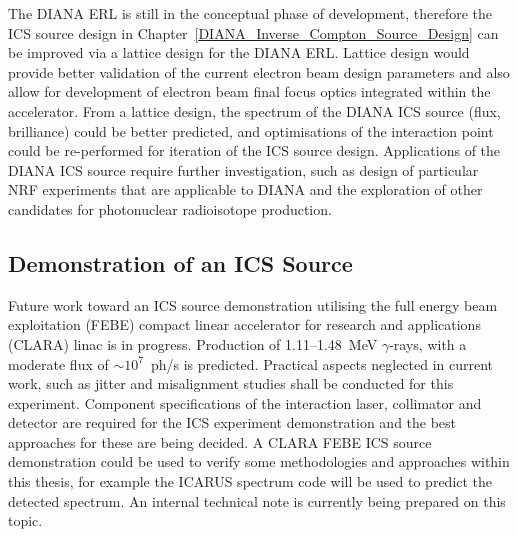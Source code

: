 \documentclass[../main.tex]{subfiles}
\begin{document}
The DIANA ERL is still in the conceptual phase of development, therefore the ICS source design in Chapter~\ref{DIANA_Inverse_Compton_Source_Design} can be improved via a lattice design for the DIANA ERL. Lattice design would provide better validation of the current electron beam design parameters and also allow for development of electron beam final focus optics integrated within the accelerator. From a lattice design, the spectrum of the DIANA ICS source (flux, brilliance) could be better predicted, and optimisations of the interaction point could be re-performed for iteration of the ICS source design. Applications of the DIANA ICS source require further investigation, such as design of particular NRF experiments that are applicable to DIANA and the exploration of other candidates for photonuclear radioisotope production.     

\subsection{Demonstration of an ICS Source}
Future work toward an ICS source demonstration utilising the full energy beam exploitation (FEBE) compact linear accelerator for research and applications (CLARA) linac \cite{angal2020design} is in progress. Production of 1.11--1.48~\si{\mega\electronvolt} $\gamma$-rays, with a moderate flux of $\sim 10^{7}$~ph/\si{\second} is predicted. Practical aspects neglected in current work, such as jitter and misalignment studies shall be conducted for this experiment. Component specifications of the interaction laser, collimator and detector are required for the ICS experiment demonstration and the best approaches for these are being decided. A CLARA FEBE ICS source demonstration could be used to verify some methodologies and approaches within this thesis, for example the \textsc{ICARUS} spectrum code will be used to predict the detected spectrum. An internal technical note is currently being prepared on this topic.
\end{document}
